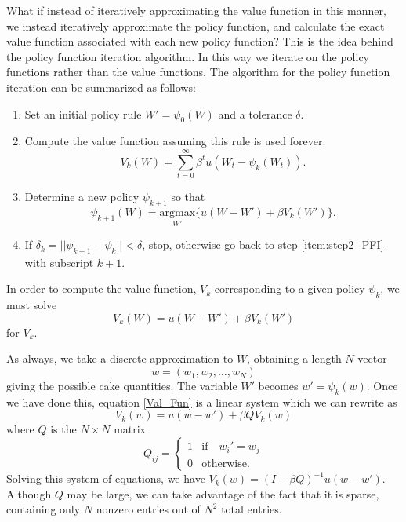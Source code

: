 What if instead of iteratively approximating the value function in this manner, we instead iteratively approximate
the policy function, and calculate the exact value function associated with each new policy function?
This is the idea behind the policy function iteration algorithm.
In this way we iterate on the policy functions rather than the value functions.
The algorithm for the policy function iteration can be summarized as follows:
\begin{enumerate}
\item Set an initial policy rule $W' = \psi_0(W)$ and a tolerance $\delta$.

\item \label{item:step2_PFI} Compute the value function assuming this rule is used forever:
\begin{equation*}
V_k(W) = \sum_{t=0}^\infty \beta^t u(W_t - \psi_k(W_t)).
\end{equation*}

\item Determine a new policy $\psi_{k+1}$ so that
\begin{equation*}
\psi_{k+1}(W) = \underset{W'}{\text{argmax}} \{u(W-W') + \beta V_k(W')\}.
\end{equation*}

\item If $\delta_k = ||\psi_{k+1} - \psi_k|| < \delta$, stop, otherwise go back to step \ref{item:step2_PFI} with subscript $k+1$.
\end{enumerate}
In order to compute the value function, $V_k$ corresponding to a given policy $\psi_k$, we must solve
\begin{equation}
\label{Val_Fun}
V_k(W) = u(W-W') + \beta V_k(W')
\end{equation}
for $V_k$.

As always, we take a discrete approximation to $W$, obtaining a length $N$ vector
\[
w = (w_1, w_2, \ldots, w_N)
\]
giving the possible cake quantities.
The variable $W'$ becomes $w' = \psi_k(w)$.
Once we have done this, equation \eqref{Val_Fun} is a linear system which we can rewrite as
\begin{equation*}
V_k(w) = u(w-w') + \beta QV_k(w)
\end{equation*}
where $Q$ is the $N\times N$ matrix
\begin{equation*}
Q_{ij} = \left\{
     \begin{array}{ll}
       1 & \text{if} \quad  w_i' = w_j\\
       0 & \text{otherwise.}
     \end{array}
   \right.
\end{equation*}
Solving this system of equations, we have $V_k(w) = (I-\beta Q)^{-1}u(w-w')$.
Although $Q$ may be large, we can take advantage of the fact that it is sparse, containing only $N$ nonzero entries out of $N^2$ total entries.

